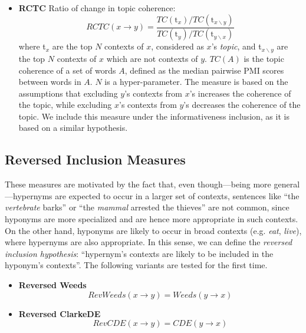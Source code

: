 \documentclass[11pt]{article}
\begin{document}
\begin{itemize}[leftmargin=*]
	\item \textbf{RCTC} \cite{rimell2014distributional} Ratio of change in topic coherence: 
	\small
	\begin{equation*}
	RCTC(x \rightarrow y)=\frac{TC(\text{t}_x)/TC(\text{t}_{x \backslash y})}{TC(\text{t}_y)/TC(\text{t}_{y \backslash x})}
	\end{equation*}
	\normalsize
	\noindent where t$_x$ are the top $N$ contexts of $x$, considered as $x$'s \emph{topic}, and t$_{x \backslash y}$ are the top $N$ contexts of $x$ which are not contexts of $y$. $TC(A)$ is the topic coherence of a set of words $A$, defined as the median pairwise PMI scores between words in $A$. $N$ is a hyper-parameter. The measure is based on the assumptions that excluding $y$'s contexts from $x$'s increases the coherence of the topic, while excluding $x$'s contexts from $y$'s decreases the coherence of the topic. We include this measure under the informativeness inclusion, as it is based on a similar hypothesis.
	
\end{itemize}

\subsection{Reversed Inclusion Measures}
\label{sec:rev_inclusion_measures}

These measures are motivated by the fact that, even though---being more general---hypernyms are expected to occur in a larger set of contexts, sentences like ``the \emph{vertebrate} barks'' or ``the \emph{mammal} arrested the thieves'' are not common, since hyponyms are more specialized and are hence more appropriate in such contexts. On the other hand, hyponyms are likely to occur in broad contexts (e.g. \emph{eat}, \emph{live}), where hypernyms are also appropriate. In this sense, we can define the \emph{reversed inclusion hypothesis}: ``hypernym's contexts are likely to be included in the hyponym's contexts''. The following variants are tested for the first time.

\begin{itemize}[leftmargin=*]

\item \textbf{Reversed Weeds} 
\begin{equation*}
RevWeeds(x \rightarrow y)= Weeds(y \rightarrow x)
\end{equation*}

\item \textbf{Reversed ClarkeDE} 
\begin{equation*}
RevCDE(x \rightarrow y) = CDE(y \rightarrow x)
\end{equation*}
	
\end{itemize}
\end{document}
